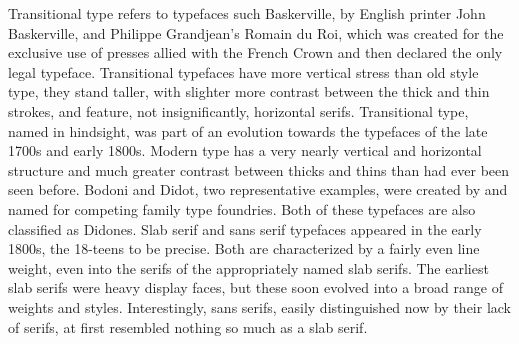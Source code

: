 \documentclass[12pt,a4paper,twocolumn]{book} %
\begin{document}
Transitional type refers to typefaces such Baskerville, by English printer John Baskerville, and Philippe Grandjean’s Romain du Roi, which was created for the exclusive use of presses allied with the French Crown and then declared the only legal typeface.
Transitional typefaces have more vertical stress than old style type, they stand taller, with slighter more contrast between the thick and thin strokes, and feature, not insignificantly, horizontal serifs. Transitional type, named in hindsight, was part of an evolution towards the typefaces of the late 1700s and early 1800s.
Modern type has a very nearly vertical and horizontal structure and much greater contrast between thicks and thins than had ever been seen before. Bodoni and Didot, two representative examples, were created by and named for competing family type foundries. Both of these typefaces are also classified as Didones.
Slab serif and sans serif typefaces appeared in the early 1800s, the 18-teens to be precise. Both are characterized by a fairly even line weight, even into the serifs of the appropriately named slab serifs. The earliest slab serifs were heavy display faces, but these soon evolved into a broad range of weights and styles. Interestingly, sans serifs, easily distinguished now by their lack of serifs, at first resembled nothing so much as a slab serif.
\end{document}
